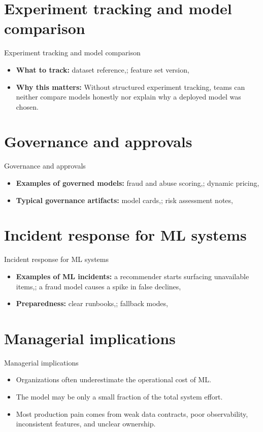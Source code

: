 \documentclass[aspectratio=169]{beamer}
\begin{document}
\section{Experiment tracking and model comparison}

\begin{frame}{Experiment tracking and model comparison}
  \begin{itemize}
    \item \textbf{What to track:} dataset reference,; feature set version,
    \item \textbf{Why this matters:} Without structured experiment tracking, teams can neither compare models honestly nor explain why a deployed model was chosen.
  \end{itemize}
\end{frame}

\section{Governance and approvals}

\begin{frame}{Governance and approvals}
  \begin{itemize}
    \item \textbf{Examples of governed models:} fraud and abuse scoring,; dynamic pricing,
    \item \textbf{Typical governance artifacts:} model cards,; risk assessment notes,
  \end{itemize}
\end{frame}

\section{Incident response for ML systems}

\begin{frame}{Incident response for ML systems}
  \begin{itemize}
    \item \textbf{Examples of ML incidents:} a recommender starts surfacing unavailable items,; a fraud model causes a spike in false declines,
    \item \textbf{Preparedness:} clear runbooks,; fallback modes,
  \end{itemize}
\end{frame}

\section{Managerial implications}

\begin{frame}{Managerial implications}
  \begin{itemize}
    \item Organizations often underestimate the operational cost of ML.
    \item The model may be only a small fraction of the total system effort.
    \item Most production pain comes from weak data contracts, poor observability, inconsistent features, and unclear ownership.
  \end{itemize}
\end{frame}
\end{document}
